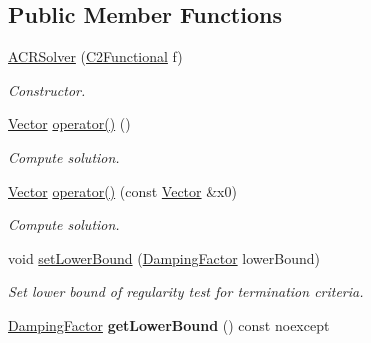 \subsection*{\-Public \-Member \-Functions}
\begin{DoxyCompactItemize}
\item 
\hyperlink{classSpacy_1_1ACR_1_1ACRSolver_a18c168d468c1ad237e246805fa1ba1a4}{\-A\-C\-R\-Solver} (\hyperlink{classSpacy_1_1C2Functional}{\-C2\-Functional} f)
\begin{DoxyCompactList}\small\item\em \-Constructor. \end{DoxyCompactList}\item 
\hypertarget{classSpacy_1_1ACR_1_1ACRSolver_ae68748adce75b5762ac7005024e29974}{\hyperlink{classSpacy_1_1Vector}{\-Vector} \hyperlink{classSpacy_1_1ACR_1_1ACRSolver_ae68748adce75b5762ac7005024e29974}{operator()} ()}\label{classSpacy_1_1ACR_1_1ACRSolver_ae68748adce75b5762ac7005024e29974}

\begin{DoxyCompactList}\small\item\em \-Compute solution. \end{DoxyCompactList}\item 
\hyperlink{classSpacy_1_1Vector}{\-Vector} \hyperlink{classSpacy_1_1ACR_1_1ACRSolver_ac7bc2ff6568728c4bd79f49f3596d2bc}{operator()} (const \hyperlink{classSpacy_1_1Vector}{\-Vector} \&x0)
\begin{DoxyCompactList}\small\item\em \-Compute solution. \end{DoxyCompactList}\item 
\hypertarget{classSpacy_1_1Mixin_1_1RegularityTest_a682ce022b0b5493e48f50f693ed64082}{void \hyperlink{classSpacy_1_1Mixin_1_1RegularityTest_a682ce022b0b5493e48f50f693ed64082}{set\-Lower\-Bound} (\hyperlink{classSpacy_1_1DampingFactor}{\-Damping\-Factor} lower\-Bound)}\label{classSpacy_1_1Mixin_1_1RegularityTest_a682ce022b0b5493e48f50f693ed64082}

\begin{DoxyCompactList}\small\item\em \-Set lower bound of regularity test for termination criteria. \end{DoxyCompactList}\item 
\hypertarget{classSpacy_1_1Mixin_1_1RegularityTest_a576995201badbfaee2064bf0d7749257}{\hyperlink{classSpacy_1_1DampingFactor}{\-Damping\-Factor} {\bfseries get\-Lower\-Bound} () const noexcept}\label{classSpacy_1_1Mixin_1_1RegularityTest_a576995201badbfaee2064bf0d7749257}


\end{DoxyCompactItemize}
